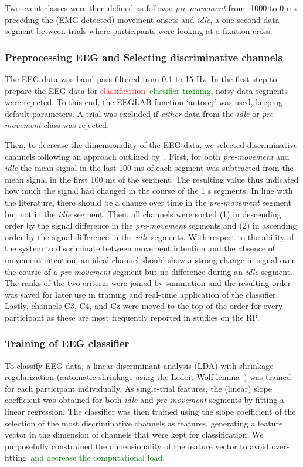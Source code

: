 Two event classes were then defined as follows: \textit{pre-movement} from -1000 to 0 ms preceding the (EMG detected) movement onsets and \textit{idle}, a one-second data segment between trials where participants were looking at a fixation cross.

\subsubsection{Preprocessing EEG and Selecting discriminative channels}\label{eeg_methods}
The EEG data was band pass filtered from 0.1 to 15 Hz. In the first step to prepare the EEG data for \textcolor{red}{classification}~\textcolor{green}{classifier training}, noisy data segments were rejected. To this end, the EEGLAB function `autorej' was used, keeping default parameters. A trial was excluded if \textit{either} data from the \textit{idle} or \textit{pre-movement} class was rejected.

Then, to decrease the dimensionality of the EEG data, we selected discriminative channels following an approach outlined by~\citep{Schultze-Kraft2021-cu}. First, for both \textit{pre-movement} and \textit{idle} the mean signal in the last 100 ms of each segment was subtracted from the mean signal in the first 100 ms of the segment. The resulting value thus indicated how much the signal had changed in the course of the 1 s segments. In line with the literature, there should be a change over time in the \textit{pre-movement} segment but not in the \textit{idle} segment. Then, all channels were sorted (1) in descending order by the signal difference in the \textit{pre-movement} segments and (2) in ascending order by the signal difference in the \textit{idle} segments. With respect to the ability of the system to discriminate between movement intention and the absence of movement intention, an ideal channel should show a strong change in signal over the course of a \textit{pre-movement} segment but no difference during an \textit{idle} segment. The ranks of the two criteria were joined by summation and the resulting order was saved for later use in training and real-time application of the classifier. Lastly, channels C3, C4, and Cz were moved to the top of the order for every participant as these are most frequently reported in studies on the RP.

\subsubsection{Training of EEG classifier}
To classify EEG data, a linear discriminant analysis (LDA) with shrinkage regularization (automatic shrinkage using the Ledoit-Wolf lemma~\cite{Ledoit2004-bi}) was trained for each participant individually. As single-trial features, the (linear) slope coefficient was obtained for both \textit{idle} and \textit{pre-movement} segments by fitting a linear regression. The classifier was then trained using the slope coefficient of the selection of the most discriminative channels as features, generating a feature vector in the dimension of channels that were kept for classification. We purposefully constrained the dimensionality of the feature vector to avoid over-fitting~\textcolor{green}{and decrease the computational load.}

